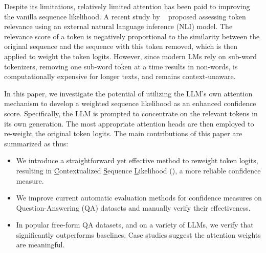 Despite its limitations, relatively limited attention has been paid to improving the vanilla sequence likelihood. 
A recent study by ~\citet{duan2023shifting} proposed assessing token relevance using an external natural language inference (NLI) model. 
The relevance score of a token is negatively proportional to the similarity between the original sequence and the sequence with this token removed, which is then applied to weight the token logits.
However, since modern LMs rely on sub-word tokenizers, removing one sub-word token at a time results in non-words, is computationally expensive for longer texts, and remains context-unaware.



In this paper, we investigate the potential of utilizing the LLM's own attention mechanism to develop a weighted sequence likelihood as an enhanced confidence score. 
Specifically, the LLM is prompted to concentrate on the relevant tokens in its own generation. 
The most appropriate attention heads are then employed to re-weight the original token logits. The main contributions of this paper are summarized as thus:
\begin{itemize}

\item We introduce a straightforward yet effective method to reweight token logits, resulting in \underline{C}ontextualized \underline{S}equence \underline{L}ikelihood (\methodname), a more reliable confidence measure.
        
\item We improve current automatic evaluation methods for confidence measures on Question-Answering (QA) datasets and manually verify their effectiveness.

\item In popular free-form QA datasets, and on a variety of LLMs, we verify that \methodname significantly outperforms baselines.
Case studies suggest the attention weights are meaningful.
\end{itemize}


